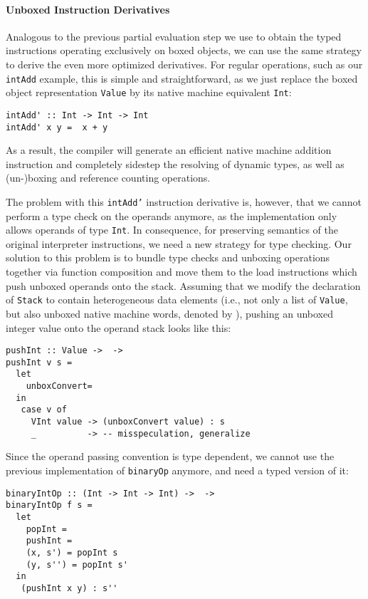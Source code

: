 \documentclass[preprint,10pt]{popl14conf}
\begin{document}
\paragraph{Unboxed Instruction Derivatives}

Analogous to the previous partial evaluation step we use to obtain the typed instructions
operating exclusively on boxed objects, we can use the same strategy to derive the even more
optimized derivatives.
For regular operations, such as our \texttt{intAdd} example, this is simple and straightforward, as
we just replace the boxed object representation \texttt{Value} by its native machine equivalent
\texttt{Int}:
\begin{lstlisting}[style=prettyhaskell]
intAdd' :: Int -> Int -> Int
intAdd' x y =  x + y
\end{lstlisting}
As a result, the compiler will generate an efficient native machine addition instruction and
completely sidestep the resolving of dynamic types, as well as (un-)boxing and reference counting
operations.


The problem with this \texttt{intAdd'} instruction derivative is, however, that we cannot perform a
type check on the operands anymore, as the implementation only allows operands of type
\texttt{Int}.
In consequence, for preserving semantics of the original interpreter instructions, we need a new
strategy for type checking.
Our solution to this problem is to bundle type checks and unboxing operations together via function
composition and move them to the load instructions which push unboxed operands onto the stack.
Assuming that we modify the declaration of \texttt{Stack} to contain heterogeneous data elements
(i.e., not only a list of \texttt{Value}, but also unboxed native machine words, denoted by
), pushing an unboxed integer value onto the operand stack looks like this:
\begin{lstlisting}[style=prettyhaskell]
pushInt :: Value ->  -> 
pushInt v s =
  let
    unboxConvert= 
  in
   case v of
     VInt value -> (unboxConvert value) : s
     _          -> -- misspeculation, generalize
\end{lstlisting}

Since the operand passing convention is type dependent, we cannot use the previous implementation of
\texttt{binaryOp} anymore, and need a typed version of it:
\begin{lstlisting}[style=prettyhaskell]
binaryIntOp :: (Int -> Int -> Int) ->  -> 
binaryIntOp f s =
  let
    popInt = 
    pushInt = 
    (x, s') = popInt s
    (y, s'') = popInt s'
  in
   (pushInt x y) : s''
\end{lstlisting}
\end{document}
